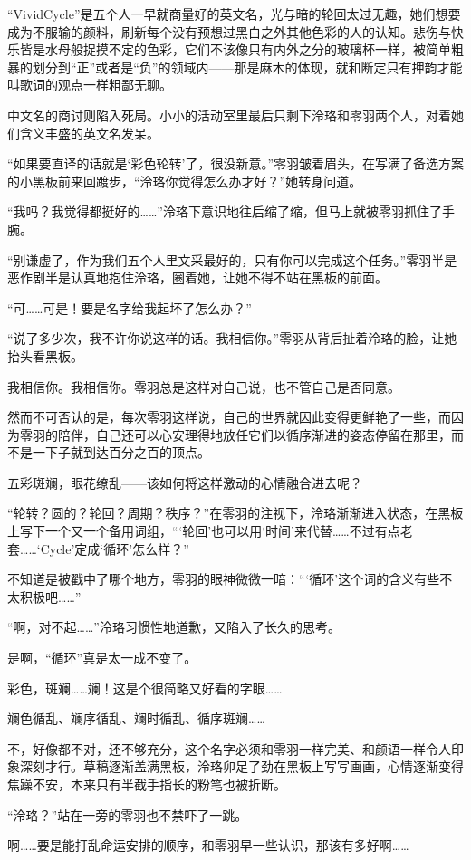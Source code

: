 \documentclass[UTF8, scheme = chinese, openany]{ctexbook}
\begin{document}
“VividCycle”是五个人一早就商量好的英文名，光与暗的轮回太过无趣，她们想要成为不服输的颜料，刷新每个没有预想过黑白之外其他色彩的人的认知。悲伤与快乐皆是水母般捉摸不定的色彩，它们不该像只有内外之分的玻璃杯一样，被简单粗暴的划分到“正”或者是“负”的领域内——那是麻木的体现，就和断定只有押韵才能叫歌词的观点一样粗鄙无聊。

中文名的商讨则陷入死局。小小的活动室里最后只剩下泠珞和零羽两个人，对着她们含义丰盛的英文名发呆。

“如果要直译的话就是‘彩色轮转’了，很没新意。”零羽皱着眉头，在写满了备选方案的小黑板前来回踱步，“泠珞你觉得怎么办才好？”她转身问道。

“我吗？我觉得都挺好的……”泠珞下意识地往后缩了缩，但马上就被零羽抓住了手腕。

“别谦虚了，作为我们五个人里文采最好的，只有你可以完成这个任务。”零羽半是恶作剧半是认真地抱住泠珞，圈着她，让她不得不站在黑板的前面。

“可……可是！要是名字给我起坏了怎么办？”

“说了多少次，我不许你说这样的话。我相信你。”零羽从背后扯着泠珞的脸，让她抬头看黑板。

我相信你。我相信你。零羽总是这样对自己说，也不管自己是否同意。

然而不可否认的是，每次零羽这样说，自己的世界就因此变得更鲜艳了一些，而因为零羽的陪伴，自己还可以心安理得地放任它们以循序渐进的姿态停留在那里，而不是一下子就到达百分之百的顶点。

五彩斑斓，眼花缭乱——该如何将这样激动的心情融合进去呢？

“轮转？圆的？轮回？周期？秩序？”在零羽的注视下，泠珞渐渐进入状态，在黑板上写下一个又一个备用词组，“‘轮回’也可以用‘时间’来代替……不过有点老套……‘Cycle’定成‘循环’怎么样？”

不知道是被戳中了哪个地方，零羽的眼神微微一暗：“‘循环’这个词的含义有些不太积极吧……”

“啊，对不起……”泠珞习惯性地道歉，又陷入了长久的思考。

是啊，“循环”真是太一成不变了。

彩色，斑斓……斓！这是个很简略又好看的字眼……

斓色循乱、斓序循乱、斓时循乱、循序斑斓……

不，好像都不对，还不够充分，这个名字必须和零羽一样完美、和颜语一样令人印象深刻才行。草稿逐渐盖满黑板，泠珞卯足了劲在黑板上写写画画，心情逐渐变得焦躁不安，本来只有半截手指长的粉笔也被折断。

“泠珞？”站在一旁的零羽也不禁吓了一跳。

啊……要是能打乱命运安排的顺序，和零羽早一些认识，那该有多好啊……
\end{document}
